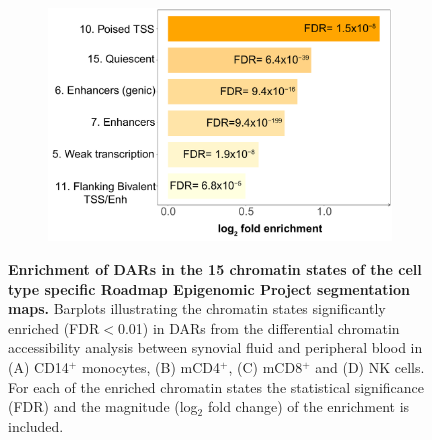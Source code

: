 \begin{figure}[H]
\begin{subfigure}[b]{0.40\textwidth}
\caption{}
\end{subfigure}
\begin{subfigure}[b]{0.40\textwidth} 
\centering
\includegraphics[width=\textwidth]{./Appendix/pdfs/Chapter5/ATAC_PSA_DAR_NK_chromatin_segments_enrichment_fc}%
\caption{}
\end{subfigure}
\caption[Enrichment of DARs in the 15 chromatin states of the cell type specific Roadmap Epigenomic Project segmentation maps.]{\textbf{Enrichment of DARs in the 15 chromatin states of the cell type specific Roadmap Epigenomic Project segmentation maps.} Barplots illustrating the chromatin states significantly enriched (FDR$<$0.01) in DARs from the differential chromatin accessibility analysis between synovial fluid and peripheral blood in (A) CD14$^+$ monocytes, (B) mCD4$^+$, (C) mCD8$^+$ and (D) NK cells. For each of the enriched chromatin states the statistical significance (FDR) and the magnitude (log$_2$ fold change) of the enrichment is included.}
\label{figure:PSA_ATAC_DARs_chromatin_states_enrichment}
\end{figure}


